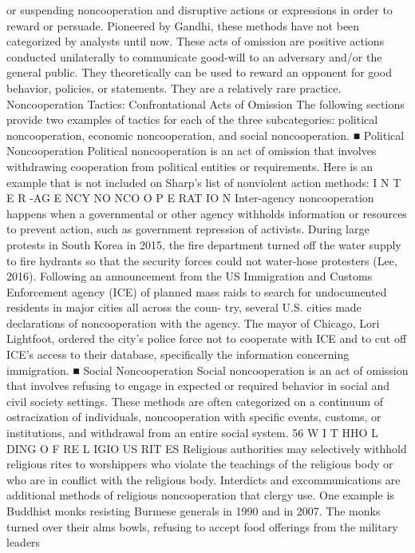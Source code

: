 \documentclass[twoside,a4paper,12pt,fleqn,openany]{extbook}
\begin{document}
or suspending noncooperation and disruptive actions or expressions in order to reward or
persuade. Pioneered by Gandhi, these methods have not been categorized by analysts until
now. These acts of omission are positive actions conducted unilaterally to communicate
good-will to an adversary and/or the general public. They theoretically can be used to reward
an opponent for good behavior, policies, or statements. They are a relatively rare practice.
Noncooperation Tactics: Confrontational Acts of Omission
The following sections provide two examples of tactics for each of the three subcategories:
political noncooperation, economic noncooperation, and social noncooperation.
■ Political Noncooperation
Political noncooperation is an act of omission that involves withdrawing cooperation from
political entities or requirements. Here is an example that is not included on Sharp’s list of
nonviolent action methods:
I N T E R -AG E NCY NO NCO O P E RAT IO N
Inter-agency noncooperation happens when a governmental or other agency withholds
information or resources to prevent action, such as government repression of activists. During
large protests in South Korea in 2015, the fire department turned off the water supply to fire
hydrants so that the security forces could not water-hose protesters (Lee, 2016). Following
an announcement from the US Immigration and Customs Enforcement agency (ICE) of
planned mass raids to search for undocumented residents in major cities all across the coun-
try, several U.S. cities made declarations of noncooperation with the agency. The mayor of
Chicago, Lori Lightfoot, ordered the city’s police force not to cooperate with ICE and to cut
off ICE’s access to their database, specifically the information concerning immigration.
■ Social Noncooperation
Social noncooperation is an act of omission that involves refusing to engage in expected or
required behavior in social and civil society settings. These methods are often categorized
on a continuum of ostracization of individuals, noncooperation with specific events, customs,
or institutions, and withdrawal from an entire social system.
56
W I T HHO L DING O F RE L IGIO US RIT ES
Religious authorities may selectively withhold religious rites to worshippers who violate the
teachings of the religious body or who are in conflict with the religious body. Interdicts and
excommunications are additional methods of religious noncooperation that clergy use.
One example is Buddhist monks resisting Burmese generals in 1990 and in 2007. The
monks turned over their alms bowls, refusing to accept food offerings from the military leaders
\end{document}
